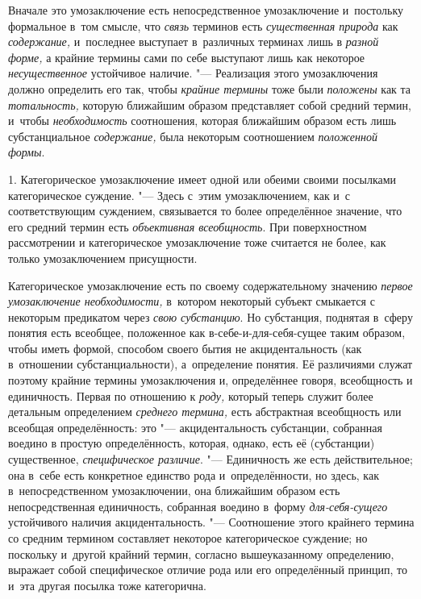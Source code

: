 Вначале это умозаключение есть непосредственное умозаключение
и~постольку формальное в~том смысле, что
{\em связь} терминов есть
{\em существенная природа}
как {\em содержание,}
и~последнее выступает в~различных терминах лишь в
{\em разной форме,} а
крайние термины сами по себе выступают лишь как некоторое
{\em несущественное}
устойчивое наличие. "--- Реализация этого
умозаключения должно определить его так, чтобы
{\em крайние термины
}тоже были
{\em положены} как та
{\em тотальность,}
которую ближайшим образом представляет собой средний термин,
и~чтобы {\em необходимость}
соотношения, которая ближайшим образом есть лишь
субстанциальное {\em содержание,}
была некоторым соотношением
{\em положенной формы}.


1. Категорическое умозаключение имеет одной или обеими своими
посылками категорическое
суждение.
"--- Здесь с~этим умозаключением, как и~с соответствующим
суждением, связывается то более определённое значение, что
его средний термин есть {\em объективная
всеобщность}. При поверхностном рассмотрении и
категорическое умозаключение тоже считается не более, как только
умозаключением присущности.

Категорическое умозаключение есть по своему содержательному
значению {\em первое умозаключение
необходимости,} в~котором некоторый субъект смыкается с
некоторым предикатом через {\em свою
субстанцию}. Но субстанция, поднятая в~сферу понятия есть
всеобщее, положенное как в-себе-и-для-себя-сущее таким образом, чтобы иметь
формой, способом своего бытия не акцидентальность (как в~отношении
субстанциальности), а~определение понятия. Её различиями служат поэтому
крайние термины умозаключения и, определённее говоря, всеобщность и
единичность. Первая по отношению к
{\em роду,} который
теперь служит более детальным определением
{\em среднего термина,}
есть абстрактная всеобщность или всеобщая определённость:
это "--- акцидентальность субстанции, собранная воедино в
простую определённость, которая, однако, есть её (субстанции) существенное,
{\em специфическое различие}. "---
Единичность же есть действительное; она в~себе есть
конкретное единство рода и~определённости, но здесь, как в~непосредственном
умозаключении, она ближайшим образом есть непосредственная единичность,
собранная воедино в~форму
{\em для-себя-сущего}
устойчивого наличия акцидентальность. "---
Соотношение этого крайнего термина со средним термином
составляет некоторое категорическое суждение; но поскольку и~другой крайний
термин, согласно вышеуказанному определению, выражает собой специфическое
отличие рода или его определённый принцип, то и~эта другая посылка тоже
категорична.

